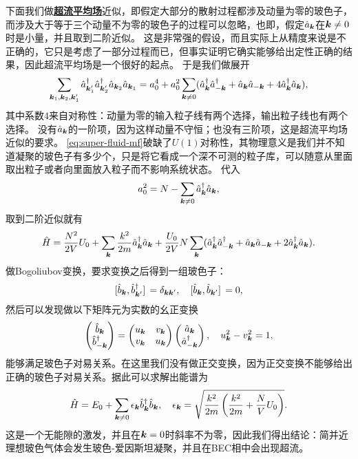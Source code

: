 \documentclass[hyperref, UTF8, a4paper]{ctexart}
\newcommand{\concept}[1]{\underline{\textbf{#1}}}
\begin{document}
下面我们做\concept{超流平均场}近似，即假定大部分的散射过程都涉及动量为零的玻色子，而涉及大于等于三个动量不为零的玻色子的过程可以忽略，也即，假定$\hat{a}_{\vb*{k}}$在$\vb*{k} \neq 0$时是小量，并且取到二阶近似。
这是非常强的假设，而且实际上从精度来说是不正确的，它只是考虑了一部分过程而已，但事实证明它确实能够给出定性正确的结果，因此超流平均场是一个很好的起点。
于是我们做展开
\begin{equation}
    \sum_{\vb*{k}_1, \vb*{k}_2, \vb*{k}_1'} \hat{a}^\dagger_{\vb*{k}_1'} \hat{a}^\dagger_{\vb*{k}_2'} \hat{a}_{\vb*{k}_2} \hat{a}_{\vb*{k}_1} = a_0^4 + a_0^2 \sum_{\vb*{k} \neq 0} (\hat{a}^\dagger_{\vb*{k}} \hat{a}^\dagger_{-\vb*{k}} + \hat{a}_{\vb*{k}} \hat{a}_{-\vb*{k}} + 4 \hat{a}^\dagger_{\vb*{k}} \hat{a}_{\vb*{k}}),
    \label{eq:super-fluid-mf}
\end{equation}
其中系数$4$来自对称性：动量为零的输入粒子线有两个选择，输出粒子线也有两个选择。
没有$\hat{a}_{\vb*{k}}$的一阶项，因为这样动量不守恒；也没有三阶项，这是超流平均场近似的要求。
\eqref{eq:super-fluid-mf}破缺了$U(1)$对称性，其物理意义是我们并不知道凝聚的玻色子有多少个，只是将它看成一个深不可测的粒子库，可以随意从里面取出粒子或者向里面放入粒子而不影响系统状态。
代入
\[
    a_0^2 = N - \sum_{\vb*{k} \neq 0} \hat{a}^\dagger_{\vb*{k}} \hat{a}_{\vb*{k}},
\]
取到二阶近似就有
\begin{equation}
    \hat{H} = \frac{N^2}{2V} U_0 + \sum_{\vb*{k}} \frac{k^2}{2m} \hat{a}^\dagger_{\vb*{k}} \hat{a}_{\vb*{k}} + \frac{U_0}{2V} N \sum_{\vb*{k}} (\hat{a}^\dagger_{\vb*{k}} \hat{a}^\dagger_{-\vb*{k}} + \hat{a}_{\vb*{k}} \hat{a}_{-\vb*{k}} + 2 \hat{a}^\dagger_{\vb*{k}} \hat{a}_{\vb*{k}}) .
\end{equation}
做Bogoliubov变换，要求变换之后得到一组玻色子：
\[
    \comm*{\hat{b}_{\vb*{k}}}{\hat{b}_{\vb*{k}'}^\dagger} = \delta_{\vb*{k} \vb*{k}'}, \quad \comm*{\hat{b}_{\vb*{k}}}{\hat{b}_{\vb*{k}'}} = 0,
\]
然后可以发现做以下矩阵元为实数的幺正变换
\begin{equation}
    \pmqty{\hat{b}_{\vb*{k}} \\ \hat{b}^\dagger_{-\vb*{k}}} = \pmqty{ u_{\vb*{k}} & v_{\vb*{k}} \\ v_{\vb*{k}} & u_{\vb*{k}} } \pmqty{\hat{a}_{\vb*{k}} \\ \hat{a}^\dagger_{-\vb*{k}}}, \quad u_{\vb*{k}}^2 - v_{\vb*{k}}^2 = 1, 
\end{equation}
能够满足玻色子对易关系。在这里我们没有做正交变换，因为正交变换不能够给出正确的玻色子对易关系。据此可以求解出能谱为
\begin{equation}
    \hat{H} = E_0 + \sum_{\vb*{k} \neq 0} \epsilon_{\vb*{k}} \hat{b}^\dagger_{\vb*{k}} \hat{b}_{\vb*{k}}, \quad \epsilon_{\vb*{k}} = \sqrt{ \frac{k^2}{2m} \left( \frac{k^2}{2m} + \frac{N}{V} U_0 \right) }.
\end{equation}
这是一个无能隙的激发，并且在$\vb*{k}=0$时斜率不为零，因此我们得出结论：简并近理想玻色气体会发生玻色-爱因斯坦凝聚，并且在BEC相中会出现超流。
\end{document}
